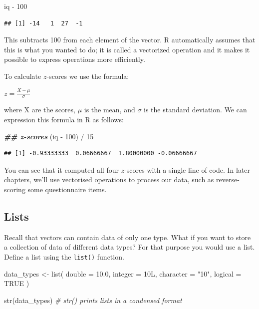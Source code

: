 \documentclass[
  oneside]{book}
\newenvironment{Shaded}{\begin{snugshade}}{\end{snugshade}}
\newcommand{\AttributeTok}[1]{\textcolor[rgb]{0.77,0.63,0.00}{#1}}
\newcommand{\CommentTok}[1]{\textcolor[rgb]{0.56,0.35,0.01}{\textit{#1}}}
\newcommand{\ConstantTok}[1]{\textcolor[rgb]{0.00,0.00,0.00}{#1}}
\newcommand{\DecValTok}[1]{\textcolor[rgb]{0.00,0.00,0.81}{#1}}
\newcommand{\DocumentationTok}[1]{\textcolor[rgb]{0.56,0.35,0.01}{\textbf{\textit{#1}}}}
\newcommand{\FloatTok}[1]{\textcolor[rgb]{0.00,0.00,0.81}{#1}}
\newcommand{\FunctionTok}[1]{\textcolor[rgb]{0.00,0.00,0.00}{#1}}
\newcommand{\NormalTok}[1]{#1}
\newcommand{\OtherTok}[1]{\textcolor[rgb]{0.56,0.35,0.01}{#1}}
\newcommand{\SpecialCharTok}[1]{\textcolor[rgb]{0.00,0.00,0.00}{#1}}
\newcommand{\StringTok}[1]{\textcolor[rgb]{0.31,0.60,0.02}{#1}}
\begin{document}
\begin{Shaded}
\begin{Highlighting}[]
\NormalTok{iq }\SpecialCharTok{{-}} \DecValTok{100}
\end{Highlighting}
\end{Shaded}

\begin{verbatim}
## [1] -14   1  27  -1
\end{verbatim}

This subtracts 100 from each element of the vector. R automatically assumes that this is what you wanted to do; it is called a vectorized operation and it makes it possible to express operations more efficiently.

To calculate \(z\)-scores we use the formula:

\(z = \frac{X - \mu}{\sigma}\)

where X are the scores, \(\mu\) is the mean, and \(\sigma\) is the standard deviation. We can expression this formula in R as follows:

\begin{Shaded}
\begin{Highlighting}[]
\DocumentationTok{\#\# z{-}scores}
\NormalTok{(iq }\SpecialCharTok{{-}} \DecValTok{100}\NormalTok{) }\SpecialCharTok{/} \DecValTok{15}
\end{Highlighting}
\end{Shaded}

\begin{verbatim}
## [1] -0.93333333  0.06666667  1.80000000 -0.06666667
\end{verbatim}

You can see that it computed all four \(z\)-scores with a single line of code. In later chapters, we'll use vectorised operations to process our data, such as reverse-scoring some questionnaire items.

\hypertarget{lists}{%
\subsection{Lists}\label{lists}}

Recall that vectors can contain data of only one type. What if you want to store a collection of data of different data types? For that purpose you would use a list. Define a list using the \texttt{list()} function.

\begin{Shaded}
\begin{Highlighting}[]
\NormalTok{data\_types }\OtherTok{\textless{}{-}} \FunctionTok{list}\NormalTok{(}
  \AttributeTok{double =} \FloatTok{10.0}\NormalTok{,}
  \AttributeTok{integer =}\NormalTok{ 10L,}
  \AttributeTok{character =} \StringTok{"10"}\NormalTok{,}
  \AttributeTok{logical =} \ConstantTok{TRUE}
\NormalTok{)}

\FunctionTok{str}\NormalTok{(data\_types) }\CommentTok{\# str() prints lists in a condensed format}
\end{Highlighting}
\end{Shaded}
\end{document}
